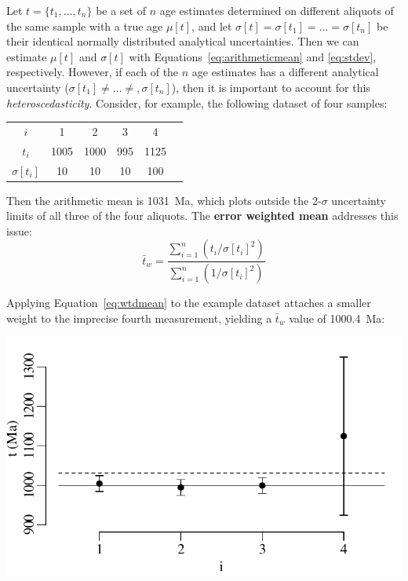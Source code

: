 \begin{refsection}
Let $t = \{t_1, \ldots, t_n\}$ be a set of $n$ age estimates
determined on different aliquots of the same sample with a true age
$\mu[t]$, and let $\sigma[t] = \sigma[t_1] = \ldots = \sigma[t_n]$ be
their identical normally distributed analytical uncertainties. Then we
can estimate $\mu[t]$ and $\sigma[t]$ with
Equations~\ref{eq:arithmeticmean} and \ref{eq:stdev}, respectively.
However, if each of the $n$ age estimates has a different analytical
uncertainty ($\sigma[t_1] \neq \ldots \neq, \sigma[t_n]$), then it is
important to account for this \textit{heteroscedasticity}. Consider,
for example, the following dataset of four samples:

\begin{center}
\begin{tabular}{c|ccccc}
  $i$ & 1 & 2 & 3 & 4 \\
$t_i$ & 1005 & 1000 & 995 & 1125 \\
$\sigma[t_i]$ & 10 & 10 & 10 & 100
\end{tabular}
\label{tab:wtdmean}
\end{center}

Then the arithmetic mean is 1031~Ma, which plots outside the
2-$\sigma$ uncertainty limits of all three of the four aliquots. The
\textbf{error weighted mean} addresses this issue:
\begin{equation}
  \bar{t}_w = \frac{\sum_{i=1}^n (t_i/\sigma[t_i]^2) }{\sum_{i=1}^n (1/\sigma[t_i]^2) }
  \label{eq:wtdmean}
\end{equation}

Applying Equation~\ref{eq:wtdmean} to the example dataset attaches a
smaller weight to the imprecise fourth measurement, yielding a
$\bar{t}_w$ value of 1000.4~Ma:

\noindent\begin{minipage}[t]{.5\textwidth}
\strut\vspace*{-\baselineskip}\newline
\includegraphics[width=\textwidth]{../figures/wtdmean.pdf}
\end{minipage}
\begin{minipage}[t]{.5\textwidth}
  \label{fig:wtdmean}
\end{minipage}


\end{refsection}
